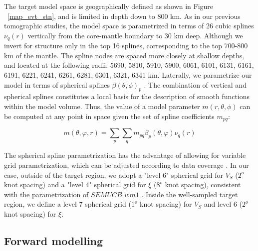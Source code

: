 \documentclass[12pt]{article}
\begin{document}
The target model space is geographically defined as shown in Figure ~\ref{map_evt_stn}, and is limited in depth down to 800 km. 
As in our previous tomographic studies, the model space is parametrized in terms of 26 cubic splines $\nu_{q}(r)$ vertically \citep{megnin2000three} from the core-mantle boundary to 30 km deep. 
Although we invert for structure only in the top 16 splines, corresponding to the top 700-800 km of the mantle. 
The spline nodes are spaced more closely at shallow depths, and located at the following radii: 5690, 5810, 5910, 5900, 6061, 6101, 6131, 6161, 6191, 6221, 6241, 6261, 6281, 6301, 6321, 6341 km.  
Laterally, we parametrize our model in terms of spherical splines $\beta(\theta,\phi)_{p}$ \citep{wang1995spherical}. 
The combination of vertical and spherical splines constitutes a local basis for the description of smooth functions within the model volume. 
Thus, the value of a model parameter $m(r,\theta,\phi)$ can be computed at any point in space given the set of spline coefficients $m_{pq}$:

\begin{equation}
	m(\theta,\varphi,r) = \sum_{p}\sum_{q}m_{pq}\beta_{p}(\theta,\varphi)\nu_{q}(r)
\end{equation}

The spherical spline parametrization has the advantage of allowing for variable grid parametrization, which can be adjusted according to data coverage \citep[e.g.][]{marone2007three}. 
In our case, outside of the target region, we adopt a "level 6" spherical grid for $V_{S}$ ($2^{o}$ knot spacing) and a "level 4" spherical grid for $\xi$ ($8^{o}$ knot spacing), consistent with the parametrization of $SEMUCB\_wm1$ \citep{french2014whole}. 
Inside the well-sampled target region, we define a level 7 spherical grid ($1^{o}$ knot spacing) for $V_{S}$ and level 6 ($2^{o}$ knot spacing) for $\xi$. 

 \subsection{Forward modelling}
\end{document}
